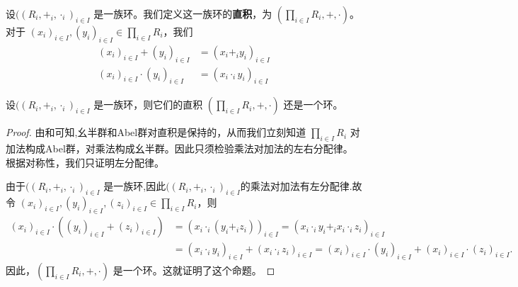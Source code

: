 \documentclass[../../main.tex]{subfiles}
\begin{document}
\begin{definition}[环的直积]
设$((R_i, +_i, \cdot_i)_{i \in I}$ 是一族环。我们定义这一族环的\textbf{直积}，为 $(\prod_{i \in I} R_i, +, \cdot)$。对于 $(x_i)_{i \in I}, (y_i)_{i \in I} \in \prod_{i \in I} R_i$，我们
\begin{align}
(x_i)_{i \in I} + (y_i)_{i \in I} &= (x_i +_i y_i)_{i \in I} \label{eq:2.23}\\
(x_i)_{i \in I} \cdot (y_i)_{i \in I} &= (x_i \cdot_i y_i)_{i \in I} \label{eq:2.24}
\end{align}
\end{definition}

\begin{proposition}[环的直积仍是环]\label{proposition:环的直积仍是环}
设$((R_i, +_i, \cdot_i)_{i \in I}$ 是一族环，则它们的直积 $(\prod_{i \in I} R_i, +, \cdot)$ 还是一个环。
\end{proposition}
\begin{proof}
由和可知,幺半群和Abel群对直积是保持的，从而我们立刻知道 $\prod_{i \in I} R_i$ 对加法构成Abel群，对乘法构成幺半群。因此只须检验乘法对加法的左右分配律。根据对称性，我们只证明左分配律。

由于$((R_i, +_i, \cdot_i)_{i \in I}$ 是一族环,因此$((R_i, +_i, \cdot_i)_{i \in I}$的乘法对加法有左分配律.故令 $(x_i)_{i \in I}, (y_i)_{i \in I}, (z_i)_{i \in I} \in \prod_{i \in I} R_i$，则
\begin{align*}
(x_i)_{i\in I}\cdot ((y_i)_{i\in I}+(z_i)_{i\in I})&=(x_i\cdot _i(y_i+_iz_i))_{i\in I}=(x_i\cdot _iy_i+_ix_i\cdot _iz_i)_{i\in I}\\
&=(x_i\cdot _iy_i)_{i\in I}+(x_i\cdot _iz_i)_{i\in I}=(x_i)_{i\in I}\cdot (y_i)_{i\in I}+(x_i)_{i\in I}\cdot (z_i)_{i\in I}.
\end{align*}
因此，$(\prod_{i \in I} R_i, +, \cdot)$ 是一个环。这就证明了这个命题。 

\end{proof}
\end{document}
